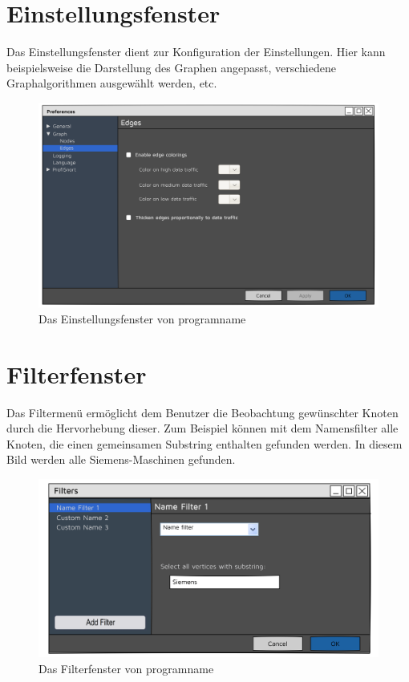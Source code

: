 \section{Einstellungsfenster}
Das Einstellungsfenster dient zur Konfiguration der Einstellungen. Hier kann beispielsweise die Darstellung des Graphen angepasst, verschiedene
Graphalgorithmen ausgewählt werden, etc.

  \begin{figure}[h!]
    \hspace*{0.3cm}\includegraphics[scale=0.07]{./img/Preferences.png}
    \caption{Das Einstellungsfenster von \gls{programname}}
  \end{figure}

\newpage
\section{Filterfenster}
Das Filtermenü ermöglicht dem Benutzer die Beobachtung gewünschter Knoten durch die Hervorhebung dieser. Zum Beispiel können mit dem Namensfilter alle Knoten, die einen gemeinsamen Substring enthalten gefunden werden. In diesem Bild werden alle Siemens-Maschinen gefunden.

\begin{figure}[h!]
  \hspace*{0.2cm}\includegraphics[scale=0.06]{./img/Filters.png}
  \caption{Das Filterfenster von \gls{programname}}
\end{figure}

